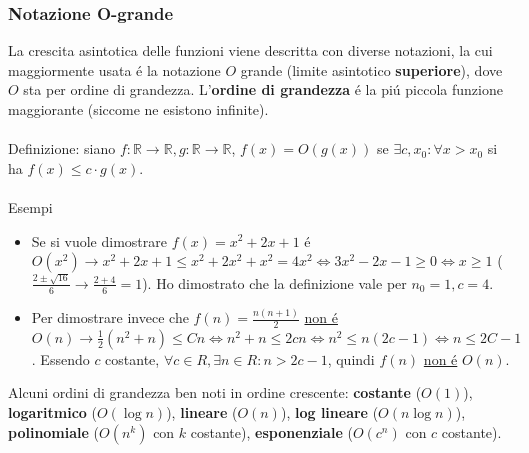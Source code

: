 \documentclass{article}
\begin{document}
\subsubsection{Notazione O-grande}
La crescita asintotica delle funzioni viene descritta con diverse notazioni, la cui maggiormente usata é la notazione $O$ grande (limite asintotico \textbf{superiore}), dove $O$ sta per ordine di grandezza. L'\textbf{ordine di grandezza} é la piú piccola funzione maggiorante (siccome ne esistono infinite).\\\\
Definizione: siano $f : \mathbb{R} \to \mathbb{R}, g : \mathbb{R} \to \mathbb{R}$, $f(x) = O(g(x))$ se $\exists c, x_0 : \forall x > x_0$ si ha $f(x) \le c \cdot g(x)$.\\\\
Esempi
\begin{itemize}
	\item Se si vuole dimostrare $f(x) = x^2+2x+1$ é $O(x^2) \rightarrow x^2+2x+1 \le x^2+2x^2+x^2 = 4x^2 \iff 3x^2-2x-1 \ge 0 \iff x \ge 1$ ($\frac{2 \pm \sqrt{16}}{6} \rightarrow \frac{2 + 4}{6} = 1$). Ho dimostrato che la definizione vale per $n_0=1, c=4$.
	\item Per dimostrare invece che $f(n)=\frac{n(n+1)}{2}$ \underline{non é} $O(n) \rightarrow \frac{1}{2}(n^2+n) \le Cn \iff n^2+n \le 2cn \iff n^2 \le n(2c-1) \iff n \le 2C-1$. Essendo $c$ costante, $\forall c \in R, \exists n \in R : n > 2c-1$, quindi $f(n)$ \underline{non é} $O(n)$.
\end{itemize}
Alcuni ordini di grandezza ben noti in ordine crescente: \textbf{costante} ($O(1)$), \textbf{logaritmico} ($O(\log{n})$), \textbf{lineare} ($O(n)$), \textbf{log lineare} ($O(n \log{n})$), \textbf{polinomiale} ($O(n^k)$ con $k$ costante), \textbf{esponenziale} ($O(c^n)$ con $c$ costante).
\end{document}
